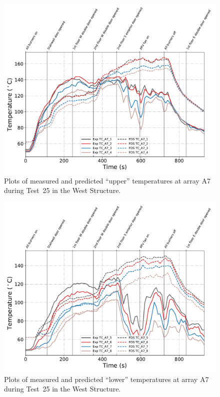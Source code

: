 \begin{figure}[!h]
	\centering
	\includegraphics[width=\columnwidth]{Figures/Plots/Validation/Temperature/Test_25_TC_A7_upper}
	\caption{Plots of measured and predicted ``upper'' temperatures at array A7 during Test~25 in the West Structure.}
	\label{fig:TCA7_upper_data_Test25}
\end{figure}
\begin{figure}[!h]
	\centering
	\includegraphics[width=\columnwidth]{Figures/Plots/Validation/Temperature/Test_25_TC_A7_lower}
	\caption{Plots of measured and predicted ``lower'' temperatures at array A7 during Test~25 in the West Structure.}
	\label{fig:TCA7_lower_data_Test25}
\end{figure}


